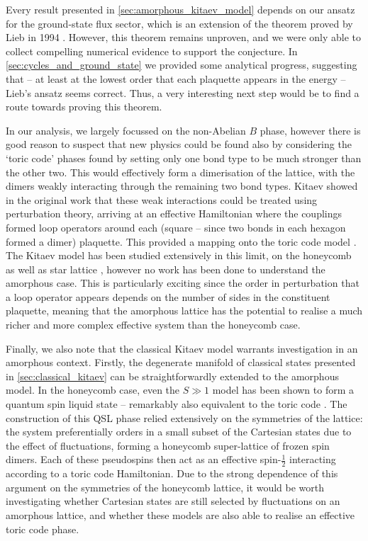 Every result presented in \textsection\ref{sec:amorphous_kitaev_model} depends on our ansatz for the ground-state flux sector, which is an extension of the theorem proved by Lieb in 1994 \cite{lieb_flux_1994}. However, this theorem remains unproven, and we were only able to collect compelling numerical evidence to support the conjecture. In \textsection\ref{sec:cycles_and_ground_state} we provided some analytical progress, suggesting that -- at least at the lowest order that each plaquette appears in the energy -- Lieb's ansatz seems correct. Thus, a very interesting next step would be to find a route towards proving this theorem. 

In our analysis, we largely focussed on the non-Abelian $B$ phase, however there is good reason to suspect that new physics could be found also by considering the `toric code' phases found by setting only one bond type to be much stronger than the other two. This would effectively form a dimerisation of the lattice, with the dimers weakly interacting through the remaining two bond types. Kitaev showed in the original work that these weak interactions could be treated using perturbation theory, arriving at an effective Hamiltonian where the couplings formed loop operators around each (square -- since two bonds in each hexagon formed a dimer) plaquette. This provided a mapping onto the toric code model \cite{kitaev_fault-tolerant_2003}. The Kitaev model has been studied extensively in this limit, on the honeycomb as well as star lattice \cite{dusuel_creation_2008,schmidt_emergent_2008,vidal_perturbative_2008}, however no work has been done to understand the amorphous case. This is particularly exciting since the order in perturbation that a loop operator appears depends on the number of sides in the constituent plaquette, meaning that the amorphous lattice has the potential to realise a much richer and more complex effective system than the honeycomb case. 

Finally, we also note that the classical Kitaev model warrants investigation in an amorphous context. Firstly, the degenerate manifold of classical states presented in \textsection\ref{sec:classical_kitaev} can be straightforwardly extended to the amorphous model. In the honeycomb case, even the $S \gg 1$ model has been shown to form a quantum spin liquid state -- remarkably also equivalent to the toric code \cite{baskaran_spin_2008, rousochatzakis_quantum_2018}. The construction of this QSL phase relied extensively on the symmetries of the lattice: the system preferentially orders in a small subset of the Cartesian states due to the effect of fluctuations, forming a honeycomb super-lattice of frozen spin dimers. Each of these pseudospins then act as an effective spin-$\frac 12$ interacting according to a toric code Hamiltonian. Due to the strong dependence of this argument on the symmetries of the honeycomb lattice, it would be worth investigating whether Cartesian states are still selected by fluctuations on an amorphous lattice, and whether these models are also able to realise an effective toric code phase. 